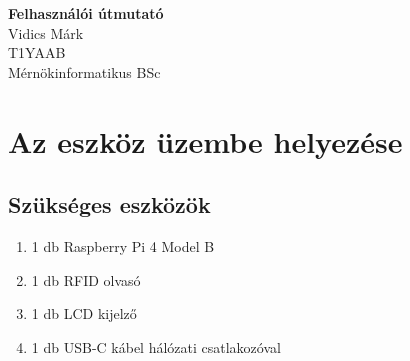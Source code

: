 \documentclass[11pt, a4paper]{article}
\begin{document}
	
	\begin{titlepage}
		\vspace*{\fill}
		\begin{center}
			\Huge \textbf{Felhasználói útmutató} \\
			Vidics Márk \\
			T1YAAB \\
			Mérnökinformatikus BSc
		\end{center}
		\vspace*{\fill}
	\end{titlepage}
	
	\tableofcontents
	
	\section{Az eszköz üzembe helyezése}
	\subsection{Szükséges eszközök}
		\begin{enumerate}
			\justifying
			\item 1 db Raspberry Pi 4 Model B
			\item 1 db RFID olvasó
			\item 1 db LCD kijelző
			\item 1 db USB-C kábel hálózati csatlakozóval
		\end{enumerate}
\end{document}
